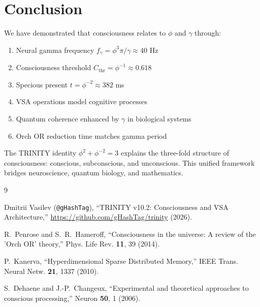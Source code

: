 \documentclass[12pt,a4paper]{article}
\begin{document}
\section{Conclusion}

We have demonstrated that consciousness relates to $\phi$ and $\gamma$ through:
\begin{enumerate}
\item Neural gamma frequency $f_\gamma = \phi^3\pi/\gamma \approx 40$ Hz
\item Consciousness threshold $C_{\text{thr}} = \phi^{-1} \approx 0.618$
\item Specious present $t = \phi^{-2} \approx 382$ ms
\item VSA operations model cognitive processes
\item Quantum coherence enhanced by $\gamma$ in biological systems
\item Orch OR reduction time matches gamma period
\end{enumerate}

The TRINITY identity $\phi^2 + \phi^{-2} = 3$ explains the three-fold structure of consciousness: conscious, subconscious, and unconscious. This unified framework bridges neuroscience, quantum biology, and mathematics.

\begin{thebibliography}{9}

Dmitrii Vasilev (\texttt{@gHashTag}),
``TRINITY v10.2: Consciousness and VSA Architecture,''
\url{https://github.com/gHashTag/trinity} (2026).

R.~Penrose and S.~R.~Hameroff,
``Consciousness in the universe: A review of the 'Orch OR' theory,''
Phys. Life Rev. \textbf{11}, 39 (2014).

P.~Kanerva,
``Hyperdimensional Sparse Distributed Memory,''
IEEE Trans. Neural Netw. \textbf{21}, 1337 (2010).

S.~Dehaene and J.-P.~Changeux,
``Experimental and theoretical approaches to conscious processing,''
Neuron \textbf{50}, 1 (2006).

\end{thebibliography}
\end{document}
